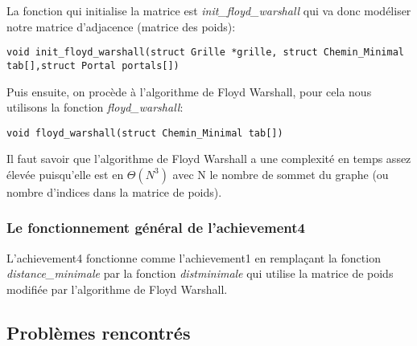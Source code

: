 La fonction qui initialise la matrice est \textit{init\_floyd\_warshall} qui va donc modéliser notre matrice d'adjacence (matrice des poids):
\begin{lstlisting}
void init_floyd_warshall(struct Grille *grille, struct Chemin_Minimal tab[],struct Portal portals[])
\end{lstlisting}
Puis ensuite, on procède à l'algorithme de Floyd Warshall, pour cela nous utilisons la fonction \textit{floyd\_warshall}:
\begin{lstlisting}
void floyd_warshall(struct Chemin_Minimal tab[]) 
\end{lstlisting}
Il faut savoir que l'algorithme de Floyd Warshall a une complexité en temps assez élevée puisqu'elle est en $\Theta(N^{3})$ avec N le nombre de sommet du graphe (ou nombre d'indices dans la matrice de poids). 

\subsubsection{Le fonctionnement général de l'achievement4}
L'achievement4 fonctionne comme l'achievement1 en remplaçant la fonction \textit{distance\_minimale} par la fonction \textit{distminimale} qui utilise la matrice de poids modifiée par l'algorithme de Floyd Warshall.

\subsection{Problèmes rencontrés}

